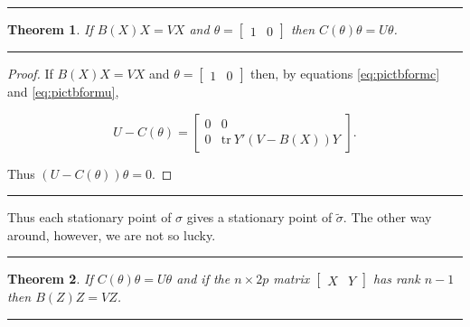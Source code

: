 \documentclass[
  12pt,
]{book}
\newtheorem{theorem}{Theorem}[chapter]
\theoremstyle{definition}
\theoremstyle{definition}
\theoremstyle{definition}
\theoremstyle{definition}
\theoremstyle{remark}
\begin{document}
\begin{center}\rule{0.5\linewidth}{0.5pt}\end{center}

\begin{theorem}
\protect\hypertarget{thm:pictpreserve}{}{\label{thm:pictpreserve} }If \(B(X)X=VX\) and \(\theta=\begin{bmatrix}1&0\end{bmatrix}\) then \(C(\theta)\theta=U\theta\).
\end{theorem}

\begin{center}\rule{0.5\linewidth}{0.5pt}\end{center}

\begin{proof}
If \(B(X)X=VX\) and \(\theta=\begin{bmatrix}1&0\end{bmatrix}\) then, by equations \eqref{eq:pictbformc} and \eqref{eq:pictbformu},

\begin{equation}
U-C(\theta)=\begin{bmatrix}0&0\\0&\text{tr}\ Y'(V-B(X))Y\end{bmatrix}.
\label{eq:picuminc}
\end{equation}

Thus \((U-C(\theta))\theta=0\).
\end{proof}

\begin{center}\rule{0.5\linewidth}{0.5pt}\end{center}

Thus each stationary point of \(\sigma\) gives a stationary point of
\(\tilde\sigma\). The other way around, however, we are not so lucky.

\begin{center}\rule{0.5\linewidth}{0.5pt}\end{center}

\begin{theorem}
\protect\hypertarget{thm:pictaround}{}{\label{thm:pictaround} }If \(C(\theta)\theta=U\theta\) and if the \(n\times 2p\) matrix
\(\begin{bmatrix}X&Y\end{bmatrix}\) has rank \(n-1\) then \(B(Z)Z=VZ\).
\end{theorem}

\begin{center}\rule{0.5\linewidth}{0.5pt}\end{center}
\end{document}
